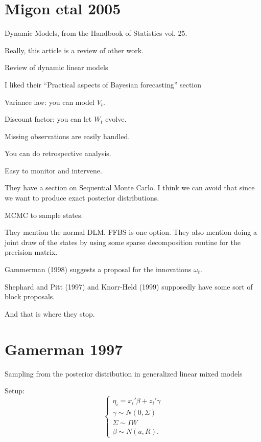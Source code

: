 \documentclass{article}
\begin{document}
\section{Migon etal 2005}

Dynamic Models, from the Handbook of Statistics vol. 25.

Really, this article is a review of other work.

\begin{outline}

\1 Review of dynamic linear models

\1 I liked their ``Practical aspects of Bayesian forecasting'' section

  \2 Variance law: you can model $V_t$.

  \2 Discount factor: you can let $W_t$ evolve.
  
  \2 Missing observations are easily handled.
  
  \2 You can do retrospective analysis.
  
  \2 Easy to monitor and intervene.

\1 They have a section on Sequential Monte Carlo.  I think we can avoid that
since we want to produce exact posterior distributions.

\1 MCMC to sample states.

\2 They mention the normal DLM.  FFBS is one option.  They also mention doing a
joint draw of the states by using some sparse decomposition routine for the
precision matrix.

\2 Gammerman (1998) suggests a proposal for the innovations $\omega_t$.

\2 Shephard and Pitt (1997) and Knorr-Held (1999) supposedly have some sort of
block proposals.

\2 And that is where they stop.

\end{outline}

\section{Gamerman 1997}

Sampling from the posterior distribution in generalized linear mixed models

Setup:
\[
\begin{cases}
\eta_i = x_i' \beta + z_i' \gamma \\
\gamma \sim N(0, \Sigma) \\
\Sigma \sim IW \\
\beta \sim N(a, R).
\end{cases}
\]
\end{document}
